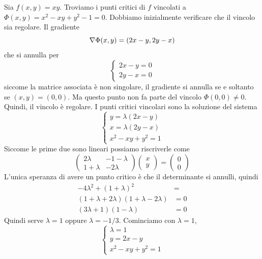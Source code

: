 \documentclass[a4paper]{article}
\begin{document}
\begin{snippetexercise}{}
    Sia \(f(x,y) = xy\). Troviamo i punti critici di \(f\)
    vincolati a \(\Phi(x,y) = x^2 - xy + y^2 - 1 = 0\).
    Dobbiamo inizialmente verificare che il vincolo sia regolare.
    Il gradiente
    \[
        \nabla \Phi(x,y) = (2x-y,2y-x)
    \]
    che si annulla per
    \[
        \begin{cases}
            2x-y=0 \\
            2y-x =0
        \end{cases}
    \]
    siccome la matrice associata è non singolare, il gradiente si annulla se e soltanto se
    \((x,y)=(0,0)\). Ma questo punto non fa parte del vincolo \(\Phi(0,0) \neq 0\).
    Quindi, il vincolo è regolare.
    I punti critici vincolari sono la soluzione del sistema
    \[
        \begin{cases}
            y = \lambda(2x-y) \\
            x = \lambda(2y-x) \\
            x^2 - xy + y^2 = 1
        \end{cases}
    \]
    Siccome le prime due sono lineari possiamo riscriverle come
    \[
        \begin{pmatrix}
            2\lambda & -1-\lambda \\
            1 + \lambda & -2\lambda
        \end{pmatrix}\begin{pmatrix}
            x \\ y
        \end{pmatrix}
        = \begin{pmatrix}
            0 \\ 0
        \end{pmatrix}
    \]
    L'unica speranza di avere un punto critico è che il determinante si annulli, quindi
    \begin{align*}
        -4\lambda^2 + {(1 + \lambda)}^2 &= \\
        (1 + \lambda + 2\lambda)(1 + \lambda - 2\lambda) &= 0 \\
        (3\lambda + 1) (1 - \lambda) &= 0
    \end{align*}
    Quindi serve \(\lambda = 1\) oppure \(\lambda = -1/3\).
    Cominciamo con \(\lambda = 1\),
    \[
        \begin{cases}
            \lambda = 1 \\
            y = 2x - y \\
            x^2 - xy + y^2 = 1
        \end{cases}
\]
\end{snippetexercise}
\end{document}
